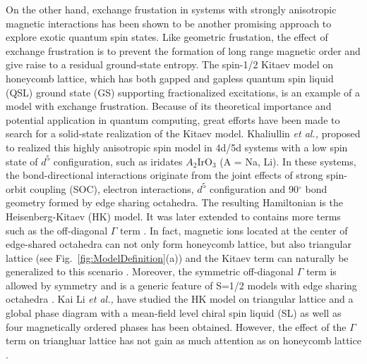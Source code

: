 \documentclass[aps,prb,reprint,amsfonts,amsmath,amssymb,showpacs,groupedaddress,superscriptaddress]{revtex4-1}
\begin{document}
On the other hand, exchange frustation in systems with strongly anisotropic magnetic interactions has been shown to be another promising approach to explore exotic quantum spin states. Like geometric frustation, the effect of exchange frustration is to prevent the formation of long range magnetic order and give raise to a residual ground-state entropy. The spin-1/2 Kitaev model \cite{Kitaev2006} on honeycomb lattice, which has both gapped and gapless quantum spin liquid (QSL) ground state (GS) supporting fractionalized excitations, is an example of a model with exchange frustration. Because of its theoretical importance and potential application in quantum computing, great efforts have been made to search for a solid-state realization of the Kitaev model. Khaliullin \emph{et al.,} \cite{Khaliullin2005, PhysRevLett.102.017205} proposed to realized this highly anisotropic spin model in 4d/5d systems with a low spin state of $d^5$ configuration, such as iridates $A_2$IrO$_3$ (A = Na, Li). In these systems, the bond-directional interactions originate from the joint effects of strong spin-orbit coupling (SOC), electron interactions, $d^5$ configuration and 90$^\circ$ bond geometry formed by edge sharing octahedra. The resulting Hamiltonian is the Heisenberg-Kitaev (HK) model. It was later extended to contains more terms such as the off-diagonal $\Gamma$ term \cite{PhysRevLett.112.077204}. In fact, magnetic ions located at the center of edge-shared octahedra can not only form honeycomb lattice, but also triangular lattice (see Fig.~\ref{fig:ModelDefinition}(a)) and the Kitaev term can naturally be generalized to this scenario \cite{PhysRevB.93.104417,PhysRevB.89.014414}. Moreover, the symmetric off-diagonal $\Gamma$ term is allowed by symmetry and is a generic feature of S=1/2 models with edge sharing octahedra \cite {PhysRevLett.112.077204}. Kai Li \emph{et al.,} \cite{KaiLi2015} have studied the HK model on triangular lattice and a global phase diagram with a mean-field level chiral spin liquid (SL) as well as four magnetically ordered phases has been obtained. However, the effect of the $\Gamma$ term on triangluar lattice has not gain as much attention as on honeycomb lattice \cite{PhysRevLett.112.077204,Rau2014,PhysRevLett.118.107203,PhysRevB.96.115103,PhysRevB.93.214431,PhysRevB.100.144422}.
\end{document}
